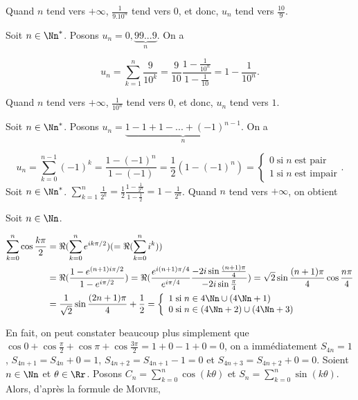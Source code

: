{\begin{enumerate}
{Quand $n$ tend vers $+\infty$, $\frac{1}{9.10^n}$ tend vers $0$, et donc, $u_n$ tend vers $\frac{10}{9}$.
\begin{center}
\end{center}

Soit $n\in\Nn^*$. Posons $u_n=0,\underbrace{99...9}_n$. On a

$$u_n=\sum_{k=1}^{n}\frac{9}{10^k}=\frac{9}{10}\frac{1-\frac{1}{10^n}}{1-\frac{1}{10}}
=1-\frac{1}{10^n}.$$

Quand $n$ tend vers $+\infty$, $\frac{1}{10^n}$ tend vers $0$, et donc, $u_n$ tend vers $1$.
\begin{center}
\end{center}
Soit $n\in\Nn^*$. Posons $u_n=\underbrace{1-1+1-...+(-1)^{n-1}}_n$.  On a

$$u_n=\sum_{k=0}^{n-1}(-1)^k=\frac{1-(-1)^n}{1-(-1)}=\frac{1}{2}(1-(-1)^n)=\left\{
\begin{array}{l}
0\;\mbox{si}\;n\;\mbox{est pair}\\
1\;\mbox{si}\;n\;\mbox{est impair}
\end{array}
\right..$$
Soit $n\in\Nn^*$.
$\sum_{k=1}^{n}\frac{1}{2^k}=\frac{1}{2}\frac{1-\frac{1}{2^n}}{1-\frac{1}{2}}=1-\frac{1}{2^n}$. Quand $n$ tend vers
$+\infty$, on obtient
\begin{center}
\end{center}
Soit $n\in\Nn$.

\begin{align*}
\sum_{k=0}^{n}\cos\frac{k\pi}{2}&=\Re(\sum_{k=0}^{n}e^{ik\pi/2})(=\Re(\sum_{k=0}^{n}i^k))\\
 &=\Re(\frac{1-e^{(n+1)i\pi/2}}{1-e^{i\pi/2}})=\Re(\frac{e^{i(n+1)\pi/4}}{e^{i\pi/4}}\frac{-2i\sin\frac{(n+1)\pi}{4}}
 {-2i\sin\frac{\pi}{4}})=\sqrt{2}\sin\frac{(n+1)\pi}{4}\cos\frac{n\pi}{4}\\
 &=\frac{1}{\sqrt{2}}\sin\frac{(2n+1)\pi}{4}+\frac{1}{2}
=\left\{
\begin{array}{l}
1\;\mbox{si}\;n\in4\Nn\cup(4\Nn+1)\\
0\;\mbox{si}\;n\in(4\Nn+2)\cup(4\Nn+3)
\end{array}
\right.
\end{align*}

En fait, on peut constater beaucoup plus simplement que $\cos0+\cos\frac{\pi}{2}+\cos\pi+\cos\frac{3\pi}{2}=1+0-1+0=0$,
on a immédiatement $S_{4n}=1$, $S_{4n+1}=S_{4n}+0=1$, $S_{4n+2}=S_{4n+1}-1=0$ et $S_{4n+3}=S_{4n+2}+0=0$.
Soient $n\in\Nn$ et $\theta\in\Rr$. Posons $C_n=\sum_{k=0}^{n}\cos(k\theta)$ et
$S_n=\sum_{k=0}^{n}\sin(k\theta)$. Alors, d'après la formule de \textsc{Moivre},

}
\end{enumerate}}
